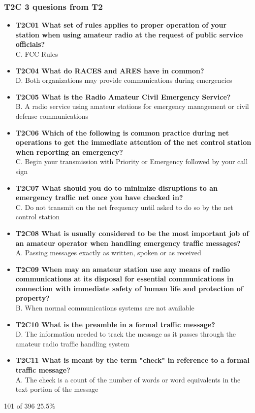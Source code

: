 \documentclass[10pt]{beamer}
\begin{document}
\begin{frame}
\frametitle{T2C 3 quesions from T2}
\begin{itemize}[<+->]
\tiny
\item\textbf{T2C01 What set of rules applies to proper operation of your station when using amateur radio at the request of public service officials?}\\ C. FCC Rules
\item\textbf{T2C04 What do RACES and ARES have in common?}\\ D. Both organizations may provide communications during emergencies
\item\textbf{T2C05 What is the Radio Amateur Civil Emergency Service?}\\ B. A radio service using amateur stations for emergency management or civil defense communications
\item\textbf{T2C06 Which of the following is common practice during net operations to get the immediate attention of the net control station when reporting an emergency?}\\ C. Begin your transmission with  Priority  or  Emergency  followed by your call sign
\item\textbf{T2C07 What should you do to minimize disruptions to an emergency traffic net once you have checked in?}\\ C. Do not transmit on the net frequency until asked to do so by the net control station
\item\textbf{T2C08 What is usually considered to be the most important job of an amateur operator when handling emergency traffic messages?}\\ A. Passing messages exactly as written, spoken or as received
\item\textbf{T2C09 When may an amateur station use any means of radio communications at its disposal for essential communications in connection with immediate safety of human life and protection of property?}\\ B. When normal communications systems are not available
\item\textbf{T2C10 What is the preamble in a formal traffic message?}\\ D. The information needed to track the message as it passes through the amateur radio traffic handling system
\item\textbf{T2C11 What is meant by the term "check" in reference to a formal traffic message?}\\ A. The check is a count of the number of words or word equivalents in the text portion of the message
\end{itemize}
\tiny 101 of 396 25.5\%
\end{frame}
\end{document}
